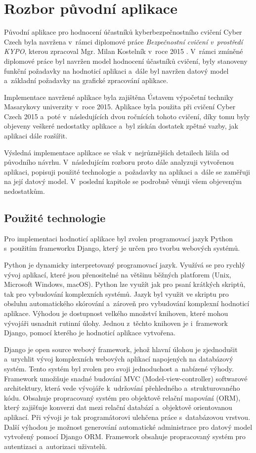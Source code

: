 \documentclass[
  digital,
  twoside,
  table, 
  nolof, 
  nolot
]{fithesis3}
\begin{document}
\chapter{Rozbor původní aplikace}
\label{oldApp}

Původní aplikace pro hodnocení účastníků kyberbezpečnostního cvičení Cyber Czech byla navržena v~rámci diplomové práce \emph{Bezpečnostní cvičení v~prostředí KYPO}, kterou zpracoval Mgr. Milan Kostelník v~roce 2015 \cite{Kostelnik2016thesis}. V~rámci zmíněné diplomové práce byl navržen model hodnocení účastníků cvičení, byly stanoveny funkční požadavky na hodnoticí aplikaci a~dále byl navržen datový model a~základní požadavky na grafické zpracování aplikace. 

Implementace navržené aplikace byla zajištěna Ústavem výpočetní techniky Masarykovy univerzity v~roce 2015. Aplikace byla použita při cvičení Cyber Czech 2015 a~poté v~následujících dvou ročnících tohoto cvičení, díky tomu byly objeveny veškeré nedostatky aplikace a~byl získán dostatek zpětné vazby, jak aplikaci dále rozšířit.

Výsledná implementace aplikace se však v~nejrůznějších detailech lišila od původního návrhu. V~následujícím rozboru proto dále analyzuji vytvořenou aplikaci, popisuji použité technologie a~požadavky na aplikaci a~dále se zaměřuji na její datový model. V~poslední kapitole se podrobně věnuji všem objeveným nedostatkům.

\section{Použité technologie}
Pro implementaci hodnoticí aplikace byl zvolen programovací jazyk Python s~použitím frameworku Django, který je určen pro tvorbu webových systémů. 

Python je dynamicky interpretovaný programovací jazyk. Využívá se pro rychlý vývoj aplikací, které jsou přenositelné na většinu běžných platforem (Unix, Microsoft Windows, macOS). Python lze využít jak pro psaní krátkých skriptů, tak pro vybudování komplexních systémů. Jazyk byl využit ve skriptu pro obsluhu automatického skórování a~zároveň pro vybudování komplexní hodnoticí aplikace. Výhodou je dostupnost velkého množství knihoven, které mohou vývojáři usnadnit rutinní úlohy. Jednou z~těchto knihoven je i~framework Django, pomocí kterého je hodnoticí aplikace vytvořena.

Django je open source webový framework, jehož hlavní úlohou je zjednodušit a~urychlit vývoj komplexních webových aplikací napojených na databázový systém. Tento systém byl zvolen pro svoji jednoduchost a~nabízené výhody. Framework umožňuje snadné budování MVC (Model-view-controller) softwarové architektury, která vede vývojáře k~udržování přehledného a~strukturovaného kódu. Obsahuje propracovaný systém pro objektově relační mapování (ORM), který zajišťuje konverzi dat mezi relační databází a~objektově orientovanou aplikací. Při vývoji je tak programátorovi ulehčena práce s~databázovou vrstvou. Další výhodou je možnost generování automatické administrace pro datový model vytvořený pomocí Django ORM. Framework obsahuje propracovaný systém pro autentizaci a~autorizaci uživatelů. 
\end{document}
